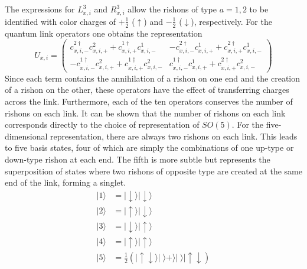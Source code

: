 \documentclass[a4paper,oneside, 11pt,english,listof=totoc,bibliography=totoc]{scrbook}
\begin{document}
The expressions for $L^3_{x,i}$ and $R^3_{x,i}$ allow the rishons of type $a=1,2$ to be identified with color charges of $+\frac{1}{2}$ ($\uparrow$) and $-\frac{1}{2}$ ($\downarrow$), respectively. For the quantum link operators one obtains the representation
\begin{equation*}
    U_{x,i}=\begin{pmatrix}
        c^{2\dagger}_{x,i,-}c^2_{x,i,+}+c^{1\dagger}_{x,i,+}c^1_{x,i,-} & -c^{2\dagger}_{x,i,-}c^1_{x,i,+}+c^{2\dagger}_{x,i,+}c^1_{x,i,-} \\
        -c^{1\dagger}_{x,i,-}c^2_{x,i,+}+c^{1\dagger}_{x,i,+}c^2_{x,i,-} & c^{1\dagger}_{x,i,-}c^1_{x,i,+}+c^{2\dagger}_{x,i,+}c^2_{x,i,-}
    \end{pmatrix}
\end{equation*}
Since each term contains the annihilation of a rishon on one end and the creation of a rishon on the other, these operators have the effect of transferring charges across the link. Furthermore, each of the ten operators conserves the number of rishons on each link. It can be shown that the number of rishons on each link corresponds directly to the choice of representation of $SO(5)$. For the five-dimensional representation, there are always two rishons on each link. This leads to five basis states, four of which are simply the combinations of one up-type or down-type rishon at each end. The fifth is more subtle but represents the superposition of states where two rishons of opposite type are created at the same end of the link, forming a singlet.
\begin{align*}
    |1\rangle&=|\downarrow\rangle|\downarrow\rangle \\
    |2\rangle&=|\uparrow\rangle|\downarrow\rangle \\
    |3\rangle&=|\downarrow\rangle|\uparrow\rangle \\
    |4\rangle&=|\uparrow\rangle|\uparrow\rangle \\
    |5\rangle&=\frac{1}{2}\left(|\uparrow\downarrow\rangle|\;\rangle+\rangle|\;\rangle|\uparrow\downarrow\right)
\end{align*}
\end{document}

